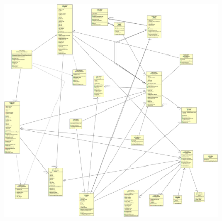 \documentclass[a4paper,titlepage]{article}
\begin{document}
\begin{figure}
\centering
\includegraphics[scale=0.2]{classDiagram.png}
\end{figure}
\end{document}
